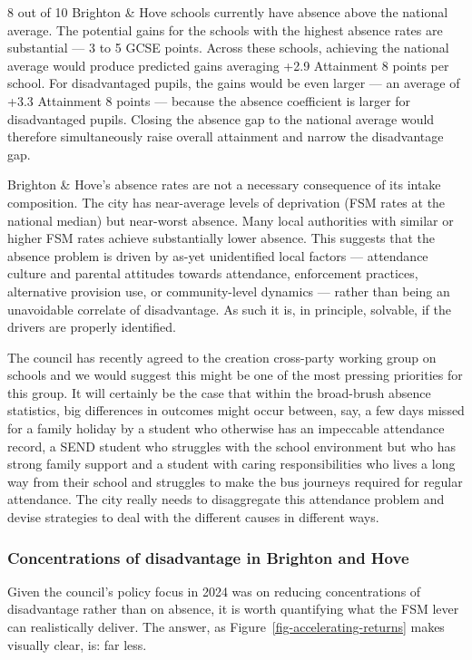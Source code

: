 \documentclass[
  11pt,
]{article}
\begin{document}
8 out of 10 Brighton \& Hove schools currently have absence above the
national average. The potential gains for the schools with the highest
absence rates are substantial --- 3 to 5 GCSE points. Across these
schools, achieving the national average would produce predicted gains
averaging +2.9 Attainment 8 points per school. For disadvantaged pupils,
the gains would be even larger --- an average of +3.3 Attainment 8
points --- because the absence coefficient is larger for disadvantaged
pupils. Closing the absence gap to the national average would therefore
simultaneously raise overall attainment and narrow the disadvantage gap.

Brighton \& Hove's absence rates are not a necessary consequence of its
intake composition. The city has near-average levels of deprivation (FSM
rates at the national median) but near-worst absence. Many local
authorities with similar or higher FSM rates achieve substantially lower
absence. This suggests that the absence problem is driven by as-yet
unidentified local factors --- attendance culture and parental attitudes
towards attendance, enforcement practices, alternative provision use, or
community-level dynamics --- rather than being an unavoidable correlate
of disadvantage. As such it is, in principle, solvable, if the drivers
are properly identified.

The council has recently agreed to the creation cross-party working
group on schools and we would suggest this might be one of the most
pressing priorities for this group. It will certainly be the case that
within the broad-brush absence statistics, big differences in outcomes
might occur between, say, a few days missed for a family holiday by a
student who otherwise has an impeccable attendance record, a SEND
student who struggles with the school environment but who has strong
family support and a student with caring responsibilities who lives a
long way from their school and struggles to make the bus journeys
required for regular attendance. The city really needs to disaggregate
this attendance problem and devise strategies to deal with the different
causes in different ways.

\subsubsection{Concentrations of disadvantage in Brighton and
Hove}\label{concentrations-of-disadvantage-in-brighton-and-hove}

Given the council's policy focus in 2024 was on reducing concentrations
of disadvantage rather than on absence, it is worth quantifying what the
FSM lever can realistically deliver. The answer, as
Figure~\ref{fig-accelerating-returns} makes visually clear, is: far
less.
\end{document}
